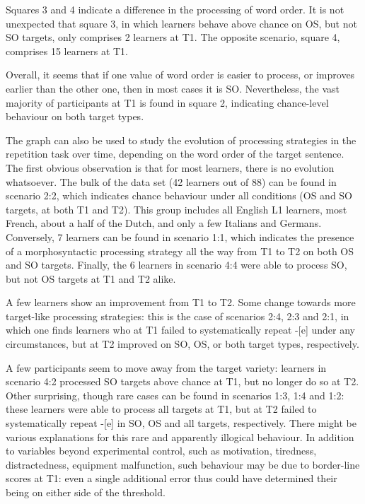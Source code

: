 Squares 3 and 4 indicate a difference in the processing of word order. It is not unexpected that square 3, in which learners behave above chance on OS, but not SO targets, only comprises 2 learners at T1. The opposite scenario, square 4, comprises 15 learners at T1. 

Overall, it seems that if one value of word order is easier to process, or improves earlier than the other one, then in most cases it is SO. Nevertheless, the vast majority of participants at T1 is found in square 2, indicating chance-level behaviour on both target types.

The graph can also be used to study the evolution of processing strategies in the repetition task over time, depending on the word order of the target sentence. The first obvious observation is that for most learners, there is no evolution whatsoever. The bulk of the data set (42 learners out of 88) can be found in scenario 2:2, which indicates chance behaviour under all conditions (OS and SO targets, at both T1 and T2). This group includes all English L1 learners, most French, about a half of the Dutch, and only a few Italians and Germans. Conversely, 7 learners can be found in scenario 1:1, which indicates the presence of a morphosyntactic processing strategy all the way from T1 to T2 on both OS and SO targets. Finally, the 6 learners in scenario 4:4 were able to process SO, but not OS targets at T1 and T2 alike.

A few learners show an improvement from T1 to T2. Some change towards more target-like processing strategies: this is the case of scenarios 2:4, 2:3 and 2:1, in which one finds learners who at T1 failed to systematically repeat -[e] under any circumstances, but at T2 improved on SO, OS, or both target types, respectively. 

A few participants seem to move away from the target variety: learners in scenario 4:2 processed SO targets above chance at T1, but no longer do so at T2. Other surprising, though rare cases can be found in scenarios 1:3, 1:4 and 1:2: these learners were able to process all targets at T1, but at T2 failed to systematically repeat -[e] in SO, OS and all targets, respectively. There might be various explanations for this rare and apparently illogical behaviour. In addition to variables beyond experimental control, such as motivation, tiredness, distractedness, equipment malfunction, such behaviour may be due to border-line scores at T1: even a single additional error thus could have determined their being on either side of the threshold. 

